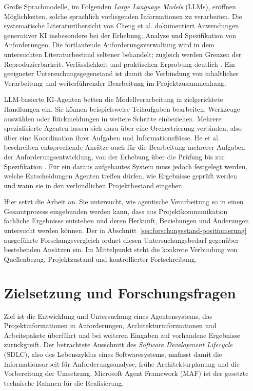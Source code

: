 Große Sprachmodelle, im Folgenden \emph{Large Language Models} (LLMs),
eröffnen Möglichkeiten, solche sprachlich vorliegenden Informationen
zu verarbeiten. Die systematische Literaturübersicht von Cheng et al.
dokumentiert Anwendungen generativer KI insbesondere bei der Erhebung,
Analyse und Spezifikation von Anforderungen. Die fortlaufende
Anforderungsverwaltung wird in dem untersuchten Literaturbestand
seltener behandelt; zugleich werden Grenzen der Reproduzierbarkeit,
Verlässlichkeit und praktischen Erprobung deutlich
\cite[S.~141, 153, 165]{cheng2026generative}.
Ein geeigneter Untersuchungsgegenstand ist damit die Verbindung von
inhaltlicher Verarbeitung und weiterführender Bearbeitung im
Projektzusammenhang.

LLM-basierte KI-Agenten betten die Modellverarbeitung in
zielgerichtete Handlungen ein. Sie können beispielsweise Teilaufgaben
bearbeiten, Werkzeuge auswählen oder Rückmeldungen in weitere Schritte
einbeziehen. Mehrere spezialisierte Agenten lassen sich dazu über eine
Orchestrierung verbinden, also über eine Koordination ihrer Aufgaben
und Informationsflüsse. He et al. beschreiben entsprechende Ansätze
auch für die Bearbeitung mehrerer Aufgaben der Anforderungsentwicklung,
von der Erhebung über die Prüfung bis zur Spezifikation
\cite[S.~124:4, 124:6]{he2025llmbasedmultiagent}.
Für ein daraus aufgebautes System muss jedoch festgelegt werden,
welche Entscheidungen Agenten treffen dürfen, wie Ergebnisse geprüft
werden und wann sie in den verbindlichen Projektbestand eingehen.

Hier setzt die Arbeit an. Sie untersucht, wie agentische Verarbeitung
so in einen Gesamtprozess eingebunden werden kann, dass aus
Projektkommunikation fachliche Ergebnisse entstehen und deren Herkunft,
Beziehungen und Änderungen untersucht werden können. Der in
Abschnitt~\ref{sec:forschungsstand-positionierung} ausgeführte
Forschungsvergleich ordnet diesen Untersuchungsbedarf gegenüber
bestehenden Ansätzen ein. Im Mittelpunkt steht die konkrete Verbindung
von Quellenbezug, Projektzustand und kontrollierter Fortschreibung.

\section{Zielsetzung und Forschungsfragen}
\label{sec:einleitung-forschungsfragen}

Ziel ist die Entwicklung und Untersuchung eines Agentensystems, das
Projektinformationen in Anforderungen, Architekturinformationen und
Arbeitspakete überführt und bei weiteren Eingaben auf vorhandene
Ergebnisse zurückgreift. Der betrachtete Ausschnitt des
\emph{Software Development Lifecycle} (SDLC), also des Lebenszyklus
eines Softwaresystems, umfasst damit die Informationsarbeit für
Anforderungsanalyse, frühe Architekturplanung und die Vorbereitung der
Umsetzung. Microsoft Agent Framework (MAF) ist der gesetzte technische
Rahmen für die Realisierung.

